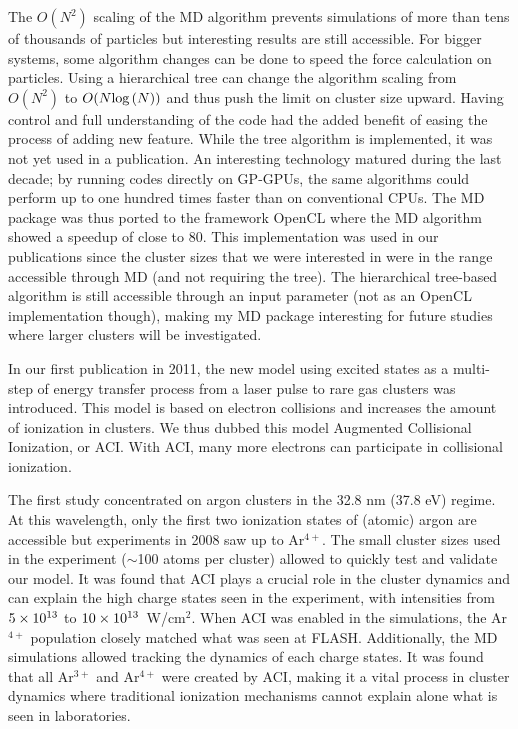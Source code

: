The $O(N^2)$ scaling of the MD algorithm prevents simulations of more than tens
of thousands of particles but interesting results are still accessible.
For bigger systems, some algorithm changes can be done to speed the force
calculation on particles. Using a hierarchical tree can change the algorithm
scaling from $O(N^2)$ to $O(N \textrm{log}\left( N \right))$ and thus push the limit on
cluster size upward. Having control and full understanding of the code had
the added benefit of easing the process of adding new feature. While the tree
algorithm is implemented, it was not yet used in a publication. An interesting
technology matured during the last decade; by running codes directly on GP-GPUs,
the same algorithms could perform up to one hundred times faster than on
conventional CPUs. The MD package was thus ported to the framework OpenCL where
the MD algorithm showed a speedup of close to 80. This implementation was used
in our publications since the cluster sizes that we were interested in were
in the range accessible through MD (and not requiring the tree). The
hierarchical tree-based algorithm is still accessible through an input parameter
(not as an OpenCL implementation though), making my MD package interesting for
future studies where larger clusters will be investigated.

In our first publication in 2011, the new model using excited states as a
multi-step of energy transfer process from a laser pulse to rare gas clusters
was introduced. This model is based on electron collisions and increases the
amount of ionization in clusters. We thus dubbed this model Augmented
Collisional Ionization, or ACI. With ACI, many more electrons can participate in
collisional ionization.

The first study concentrated on argon clusters in the 32.8 nm (37.8 eV) regime.
At this wavelength, only the first two ionization states of (atomic) argon are
accessible but experiments in 2008 saw up to Ar$^{4+}$. The small cluster sizes
used in the experiment ($\sim$100 atoms per cluster) allowed to quickly test and
validate our model. It was found that ACI plays a crucial role in the cluster
dynamics and can explain the high charge states seen in the experiment, with
intensities from $\ten{5}{13}$ to $\ten{10}{13}$~W/cm$^{2}$. When ACI was
enabled in the simulations, the Ar$^{4+}$ population closely matched what was
seen at FLASH. Additionally, the MD simulations allowed tracking the dynamics
of each charge states. It was found that all Ar$^{3+}$ and Ar$^{4+}$ were
created by ACI, making it a vital process in cluster dynamics where traditional
ionization mechanisms cannot explain alone what is seen in laboratories.

